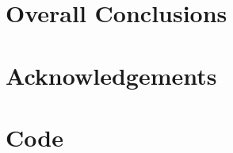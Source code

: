 \documentclass[b5paper, 12pt, openright]{book} %
\begin{document}
\chapter*[Overall Conclusions]{Overall Conclusions}\label{ch:conclusions}
	



\chapter*[Acknowledgements]{Acknowledgements}
	



	\appendix

\chapter{Code}
	\label{ch:code}
	\graphicspath{ {./contents_img/code/} }
	




	\printindex
\end{document}
